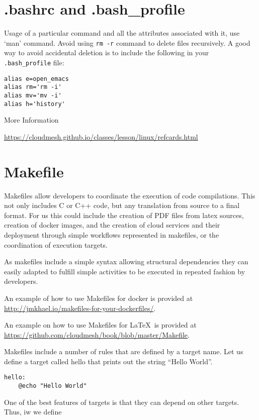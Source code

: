 \section{.bashrc and .bash\_profile}

Usage of a particular command and all the attributes associated with it,
use `man' command. Avoid using \verb|rm -r| command to delete files
recursively. A good way to avoid accidental deletion is to include the
following in your \verb|.bash_profile| file:

\begin{verbatim}
alias e=open_emacs
alias rm='rm -i'
alias mv='mv -i' 
alias h='history'
\end{verbatim}

More Information

\url{https://cloudmesh.github.io/classes/lesson/linux/refcards.html}

\section{Makefile}
\label{s:makefile}

Makefiles allow developers to coordinate the execution of code
compilations. This not only includes C or C++ code, but any
translation from source to a final format. For us this could include
the creation of PDF files from latex sources, creation of docker
images, and the creation of cloud services and their deployment
through simple workflows represented in makefiles, or the coordination
of execution targets.

As makefiles include a simple syntax allowing structural dependencies
they can easily adapted to fulfill simple activities to be executed in
repeated fashion by developers.

An example of how to use Makefiles for docker is provided at
\url{http://jmkhael.io/makefiles-for-your-dockerfiles/}.

An example on how to use Makefiles for \LaTeX~is provided at
\url{https://github.com/cloudmesh/book/blob/master/Makefile}.

Makefiles include a number of rules that are defined by a target
name. Let us define a target called hello that prints out the string
``Hello World''.

\begin{lstlisting} 
hello:
    @echo "Hello World"
\end{lstlisting} 

One of the best features of targets is that they can depend on other
targets. Thus, iw we define 

